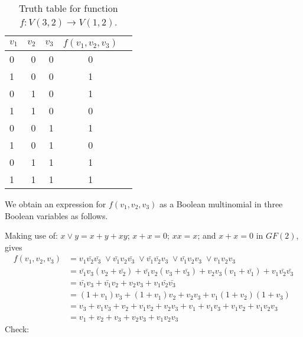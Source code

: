
\begin{table}[!htp]\centering
\begin{tabular}{lrr|cr}\toprule
$v_1$ &$v_2$ &$v_3$ &$f(v_1, v_2, v_3)$ \\\midrule
0 &0 &0 &0 \\
1 &0 &0 &1 \\
0 &1 &0 &1 \\
1 &1 &0 &0 \\
0 &0 &1 &1 \\
1 &0 &1 &0 \\
0 &1 &1 &1 \\
1 &1 &1 &1 \\
\bottomrule
\end{tabular}
\caption{Truth table for function $f:V(3,2) \rightarrow V(1,2)$.}\label{tab:4}
\end{table}
We obtain an expression for $f(v_1, v_2, v_3)$ as a Boolean multinomial in three Boolean variables as follows.

Making use of: $x\lor y = x + y +xy$; $x + x = 0$; $xx=x$; and $x + x=0$ in $GF(2)$, gives
\begin{align}
f(v_1, v_2, v_3) &=      v_1  \bar{v_2} \bar{v_3}\; \lor
                    \bar{v_1}      v_2  \bar{v_3}\; \lor
                    \bar{v_1} \bar{v_2}      v_3 \; \lor
                    \bar{v_1}      v_2       v_3 \; \lor
                         v_1       v_2       v_3\nonumber\\
              &= \bar{v_1}v_3(v_2 + \bar{v_2}) + 
                 \bar{v_1}v_2(v_3 + \bar{v_3}) +
                      v_2 v_3(v_1 + \bar{v_1}) + 
                      v_1\bar{v_2}\bar{v_3}\nonumber \\
              &= \bar{v_1}v_3 + 
                 \bar{v_1}v_2 +
                      v_2 v_3 + 
                      v_1\bar{v_2}\bar{v_3}\nonumber \\
              &= (1 + v_1)v_3 + 
                 (1 + v_1)v_2 +
                      v_2 v_3 + 
                      v_1(1 + v_2)(1 + v_3)\nonumber \\
              &= v_3 + v_1v_3 + 
                 v_2 + v_1v_2 +
                      v_2 v_3 + 
                      v_1 + v_1v_3 + v_1v_2 + v_1v_2v_3\nonumber\\
\label{bool:1}             &= v_1 +v_2 + v_3 + v_2v_3 +v_1v_2v_3
\end{align}
Check:

